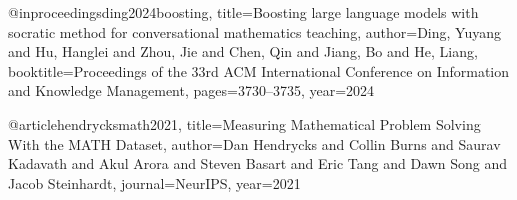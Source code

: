 @inproceedings{ding2024boosting,
  title={Boosting large language models with socratic method for conversational mathematics teaching},
  author={Ding, Yuyang and Hu, Hanglei and Zhou, Jie and Chen, Qin and Jiang, Bo and He, Liang},
  booktitle={Proceedings of the 33rd ACM International Conference on Information and Knowledge Management},
  pages={3730--3735},
  year={2024}
}

@article{hendrycksmath2021,
  title={Measuring Mathematical Problem Solving With the MATH Dataset},
  author={Dan Hendrycks and Collin Burns and Saurav Kadavath and Akul Arora and Steven Basart and Eric Tang and Dawn Song and Jacob Steinhardt},
  journal={NeurIPS},
  year={2021}
}